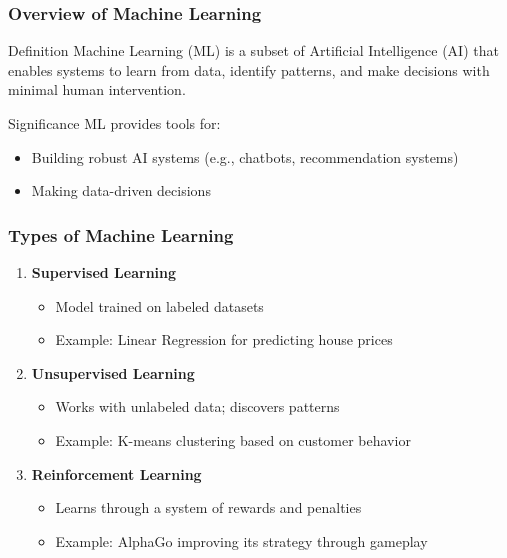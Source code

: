 \documentclass[aspectratio=169]{beamer}
\begin{document}
\frame{\titlepage}

\begin{frame}[fragile]
    \maketitle
\end{frame}

\begin{frame}[fragile]
    \frametitle{Overview of Machine Learning}
    \begin{block}{Definition}
        Machine Learning (ML) is a subset of Artificial Intelligence (AI) that enables systems to learn from data, identify patterns, and make decisions with minimal human intervention.
    \end{block}
    
    \begin{block}{Significance}
        ML provides tools for:
        \begin{itemize}
            \item Building robust AI systems (e.g., chatbots, recommendation systems)
            \item Making data-driven decisions
        \end{itemize}
    \end{block}
\end{frame}

\begin{frame}[fragile]
    \frametitle{Types of Machine Learning}
    \begin{enumerate}
        \item \textbf{Supervised Learning}
            \begin{itemize}
                \item Model trained on labeled datasets
                \item Example: Linear Regression for predicting house prices
            \end{itemize}
        
        \item \textbf{Unsupervised Learning}
            \begin{itemize}
                \item Works with unlabeled data; discovers patterns
                \item Example: K-means clustering based on customer behavior
            \end{itemize}
        
        \item \textbf{Reinforcement Learning}
            \begin{itemize}
                \item Learns through a system of rewards and penalties
                \item Example: AlphaGo improving its strategy through gameplay
            \end{itemize}
    \end{enumerate}
\end{frame}
\end{document}
